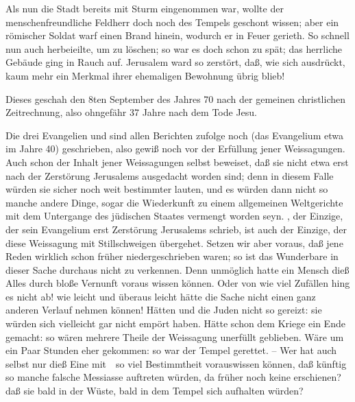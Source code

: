 \begin{aufza}
\begin{aufzb}
\item Als nun die Stadt bereits mit Sturm eingenommen war, wollte der menschenfreundliche Feldherr doch noch des Tempels geschont wissen; aber ein römischer Soldat warf einen Brand hinein, wodurch er in Feuer gerieth. So schnell nun auch  herbeieilte, um zu löschen; so war es doch schon zu spät; das herrliche Gebäude ging in Rauch auf. Jerusalem ward so zerstört, daß, wie  sich ausdrückt, kaum mehr ein Merkmal ihrer ehemaligen Bewohnung übrig blieb!
\item Dieses geschah den 8ten September des Jahres 70 nach der gemeinen christlichen Zeitrechnung, also ohngefähr 37 Jahre nach dem Tode Jesu.
\end{aufzb}
\item Die drei Evangelien  und  sind allen Berichten zufolge noch  (das Evangelium  etwa im Jahre 40) geschrieben, also gewiß noch vor der Erfüllung jener Weissagungen. Auch schon der Inhalt jener Weissagungen selbst beweiset, daß sie nicht etwa erst nach der Zerstörung Jerusalems ausgedacht worden sind; denn in diesem Falle würden sie sicher noch weit bestimmter lauten, und es würden dann nicht so manche andere Dinge, sogar die Wiederkunft  zu einem allgemeinen Weltgerichte mit dem Untergange des jüdischen Staates vermengt worden seyn. , der Einzige, der sein Evangelium erst  Zerstörung Jerusalems schrieb, ist auch der Einzige, der diese Weissagung mit Stillschweigen übergehet. Setzen wir aber voraus, daß jene Reden  wirklich schon früher niedergeschrieben waren; so ist das Wunderbare in dieser Sache durchaus nicht zu verkennen. Denn unmöglich hatte ein Mensch dieß Alles durch bloße Vernunft voraus wissen können. Oder von wie viel Zufällen hing es nicht ab! wie leicht und überaus leicht hätte die Sache nicht einen ganz anderen Verlauf nehmen können! Hätten  und  die Juden nicht so gereizt: sie würden sich vielleicht gar nicht empört haben. Hätte  schon dem Kriege ein Ende gemacht: so wären mehrere Theile der Weissagung unerfüllt geblieben. Wäre  um ein Paar Stunden eher gekommen: so war der Tempel gerettet. -- Wer hat auch selbst nur dieß Eine mit~\ so viel Bestimmtheit vorauswissen können, daß künftig so manche falsche Messiasse auftreten würden, da früher noch keine erschienen? daß sie bald in der Wüste, bald in dem Tempel sich aufhalten würden? \usw\

\end{aufza}
